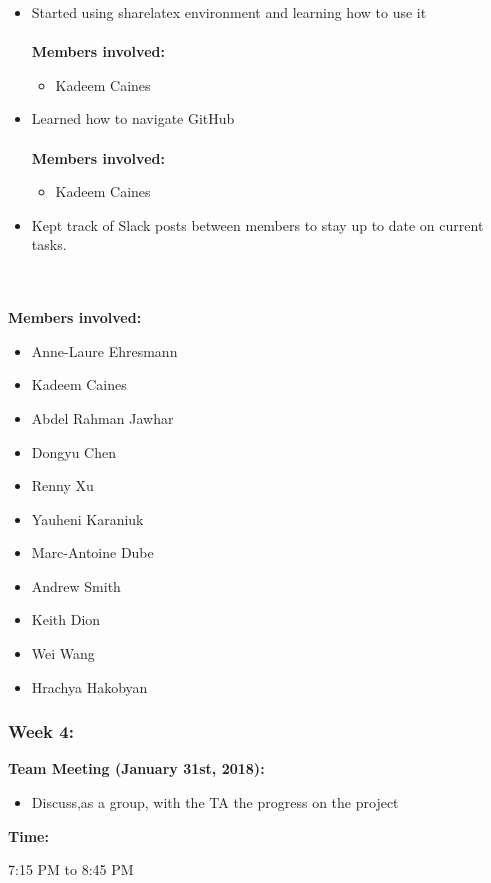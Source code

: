 \documentclass[11pt]{article}
\begin{document}
\begin{itemize}
    \item Started using sharelatex environment and learning how to use it
    \\ \\
\textbf{Members involved:}

\begin{itemize}
    \item Kadeem Caines
\end{itemize}
    \item Learned how to navigate GitHub
    \\ \\
\textbf{Members involved:}
\begin{itemize}
    \item Kadeem Caines
\end{itemize}
    \item Kept track of Slack posts between members to stay up to date on current tasks.  
\end{itemize}
    \\ \\
\textbf{Members involved:}
\begin{itemize}
        \item Anne-Laure	Ehresmann
    \item Kadeem	Caines
\item Abdel Rahman	Jawhar
\item Dongyu	Chen
\item Renny	Xu
\item Yauheni	Karaniuk
\item Marc-Antoine	Dube
\item Andrew	Smith
\item  Keith	Dion
\item   Wei	Wang
\item Hrachya	Hakobyan
\end{itemize}

\subsubsection{Week 4:}

\textbf{Team Meeting (January 31st, 2018):}
\begin{itemize}
    \item Discuss,as a group, with the TA the progress on the project
\end{itemize}

\textbf{Time:}

7:15 PM to 8:45 PM
\end{document}
